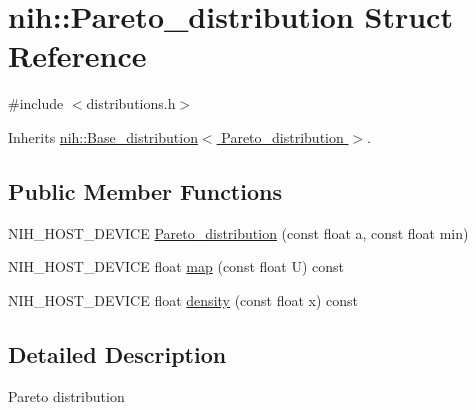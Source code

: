 \hypertarget{structnih_1_1_pareto__distribution}{
\section{nih\-:\-:\-Pareto\-\_\-distribution \-Struct \-Reference}
\label{structnih_1_1_pareto__distribution}
}


{\ttfamily \#include $<$distributions.\-h$>$}



\-Inherits \hyperlink{structnih_1_1_base__distribution}{nih\-::\-Base\-\_\-distribution$<$ Pareto\-\_\-distribution $>$}.

\subsection*{\-Public \-Member \-Functions}
\begin{DoxyCompactItemize}
\item 
\-N\-I\-H\-\_\-\-H\-O\-S\-T\-\_\-\-D\-E\-V\-I\-C\-E \hyperlink{structnih_1_1_pareto__distribution_aa60c9e6b328d61f27b1e2e86fe85f37c}{\-Pareto\-\_\-distribution} (const float a, const float min)
\item 
\-N\-I\-H\-\_\-\-H\-O\-S\-T\-\_\-\-D\-E\-V\-I\-C\-E float \hyperlink{structnih_1_1_pareto__distribution_a08b43ee449861420eafe309c2257a9e0}{map} (const float \-U) const 
\item 
\-N\-I\-H\-\_\-\-H\-O\-S\-T\-\_\-\-D\-E\-V\-I\-C\-E float \hyperlink{structnih_1_1_pareto__distribution_aeed562d580b3e12c5b73fca4f49a3426}{density} (const float x) const 
\end{DoxyCompactItemize}


\subsection{\-Detailed \-Description}
\-Pareto distribution 

